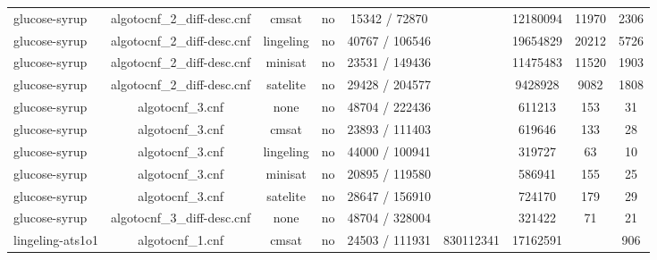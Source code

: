 \begin{appendices}
\begin{table}[p]
\begin{center}
\begin{tabular}{l|cccccccc}
  glucose-syrup                  & algotocnf\_2\_diff-desc.cnf    & cmsat      & no    & 15342 / 72870 &           & 12180094  & 11970      & 2306 \\ %
  glucose-syrup                  & algotocnf\_2\_diff-desc.cnf    & lingeling  & no    & 40767 / 106546 &           & 19654829  & 20212      & 5726 \\ %
  glucose-syrup                  & algotocnf\_2\_diff-desc.cnf    & minisat    & no    & 23531 / 149436 &           & 11475483  & 11520      & 1903 \\ %
  glucose-syrup                  & algotocnf\_2\_diff-desc.cnf    & satelite   & no    & 29428 / 204577 &           & 9428928   & 9082       & 1808 \\ %
  glucose-syrup                  & algotocnf\_3.cnf               & none       & no    & 48704 / 222436 &           & 611213    & 153        & 31 \\ %
  glucose-syrup                  & algotocnf\_3.cnf               & cmsat      & no    & 23893 / 111403 &           & 619646    & 133        & 28 \\ %
  glucose-syrup                  & algotocnf\_3.cnf               & lingeling  & no    & 44000 / 100941 &           & 319727    & 63         & 10 \\ %
  glucose-syrup                  & algotocnf\_3.cnf               & minisat    & no    & 20895 / 119580 &           & 586941    & 155        & 25 \\ %
  glucose-syrup                  & algotocnf\_3.cnf               & satelite   & no    & 28647 / 156910 &           & 724170    & 179        & 29 \\ %
  glucose-syrup                  & algotocnf\_3\_diff-desc.cnf    & none       & no    & 48704 / 328004 &           & 321422    & 71         & 21 \\ %
  lingeling-ats1o1               & algotocnf\_1.cnf               & cmsat      & no    & 24503 / 111931 & 830112341 & 17162591  &            & 906 \\ %

\end{tabular}
\end{center}
\end{table}
\end{appendices}
